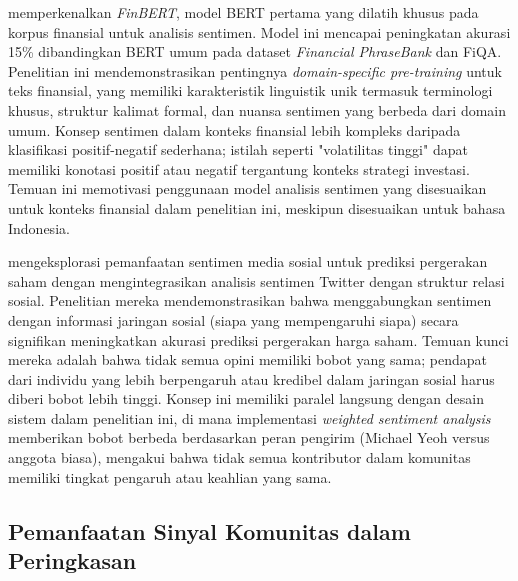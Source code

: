 \textcite{araci2019} memperkenalkan \textit{FinBERT}, model BERT pertama yang dilatih khusus pada korpus finansial untuk analisis sentimen. Model ini mencapai peningkatan akurasi 15\% dibandingkan BERT umum pada dataset \textit{Financial PhraseBank} dan FiQA. Penelitian ini mendemonstrasikan pentingnya \textit{domain-specific pre-training} untuk teks finansial, yang memiliki karakteristik linguistik unik termasuk terminologi khusus, struktur kalimat formal, dan nuansa sentimen yang berbeda dari domain umum. Konsep sentimen dalam konteks finansial lebih kompleks daripada klasifikasi positif-negatif sederhana; istilah seperti "volatilitas tinggi" dapat memiliki konotasi positif atau negatif tergantung konteks strategi investasi. Temuan ini memotivasi penggunaan model analisis sentimen yang disesuaikan untuk konteks finansial dalam penelitian ini, meskipun disesuaikan untuk bahasa Indonesia.

\textcite{si2014} mengeksplorasi pemanfaatan sentimen media sosial untuk prediksi pergerakan saham dengan mengintegrasikan analisis sentimen Twitter dengan struktur relasi sosial. Penelitian mereka mendemonstrasikan bahwa menggabungkan sentimen dengan informasi jaringan sosial (siapa yang mempengaruhi siapa) secara signifikan meningkatkan akurasi prediksi pergerakan harga saham. Temuan kunci mereka adalah bahwa tidak semua opini memiliki bobot yang sama; pendapat dari individu yang lebih berpengaruh atau kredibel dalam jaringan sosial harus diberi bobot lebih tinggi. Konsep ini memiliki paralel langsung dengan desain sistem dalam penelitian ini, di mana implementasi \textit{weighted sentiment analysis} memberikan bobot berbeda berdasarkan peran pengirim (Michael Yeoh versus anggota biasa), mengakui bahwa tidak semua kontributor dalam komunitas memiliki tingkat pengaruh atau keahlian yang sama.

\subsection{Pemanfaatan Sinyal Komunitas dalam Peringkasan}

